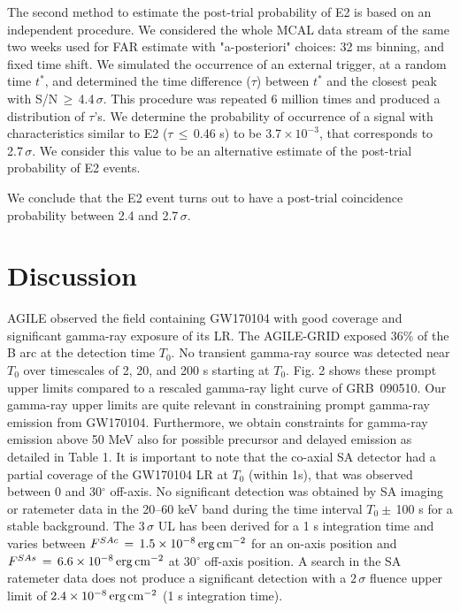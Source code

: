 \documentclass[preprint2]{aastex}
\def\gw {GW170104 }
\def\gwp {GW170104}
\def \fv {}
\def \fvv {}
\def \fvvv {}
\def \fvr {}
\def \mt {}
\begin{document}
{\fvv The second method to estimate the post-trial probability of E2 is based on an independent procedure. We considered the whole MCAL data stream of the same two weeks used for FAR estimate {\fvvv with "a-posteriori" choices: 32 ms binning,} and fixed time shift. We simulated the occurrence of an external trigger, at a random time $t^{*}$, and determined the time difference ($\tau$) between $t^{*}$ and the closest peak with S/N\,$\geq\,$4.4\,$\sigma$. This procedure was repeated 6 million times and produced a distribution of $\tau$'s. We determine the probability of occurrence of a signal with characteristics similar to E2 ($\tau\,\leq \,$0.46 s) to be 3.7\,$\times\,10^{-3}$, that corresponds to 2.7\,$\sigma$. We consider this value to be an alternative estimate of the post-trial probability {\fvvv of E2 events}. 

{\fvv We conclude that the} E2 event turns out to {\fvv have} a post-trial {\fvv coincidence} probability {\fvv between {\fvr 2.4} and 2.7$ \, \sigma$}.


\section{Discussion}

AGILE observed the field containing \gw with good coverage and
significant gamma-ray exposure of its LR. The AGILE-GRID {\mt
exposed 36\% of the} B arc at the detection time $T_0$. No transient
gamma-ray source was detected near $T_0$ over timescales of 2, 20,
and 200 s starting at $T_0$. Fig. 2 shows these prompt upper
limits compared to a rescaled gamma-ray light curve of GRB~090510.
{\fv Our gamma-ray upper limits are quite relevant in constraining
prompt gamma-ray emission from \gwp.} Furthermore, we obtain
constraints for gamma-ray emission above 50 MeV also for possible
precursor and delayed emission as detailed in Table 1.
%
%
It is important to note that the co-axial SA detector had a partial
coverage of the \gw LR at $T_0$ (within 1s), that was observed
between 0 and 30$^{\circ}$ off-axis. No significant detection was
obtained by SA imaging or ratemeter data
in the 20--60 keV band during the time interval $T_0 \pm$\,100 s
for a stable background. The $3\,\sigma$ UL has been derived for a 1 
s integration time and varies between $F^{SAc}\,=\, 1.5 \times 10^{-8} \, \rm erg \,
cm^{-2}$ for an on-axis position and $F^{SAs}\,=\, 6.6 \times 10^{-8} \, \rm erg \,
cm^{-2}$ at 30$^{\circ}$ off-axis position. A search in the SA
ratemeter data does not produce a significant detection with a
$2\,\sigma$ fluence upper limit of $2.4 \times 10^{-8} \, \rm erg \,
cm^{-2}$ {\fv (1 s integration time)}.

}
\end{document}
